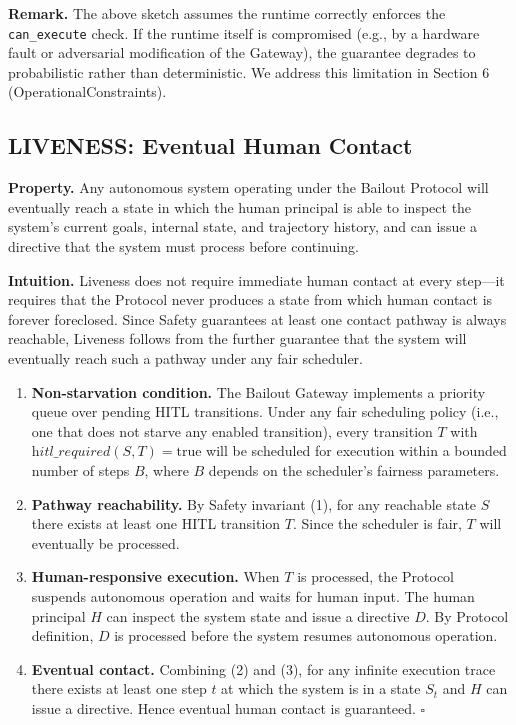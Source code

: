 \textbf{Remark.} The above sketch assumes the runtime correctly enforces the \texttt{can\_execute} check. If the runtime itself is compromised (e.g., by a hardware fault or adversarial modification of the Gateway), the guarantee degrades to probabilistic rather than deterministic. We address this limitation in Section 6 (OperationalConstraints).

\subsection{LIVENESS: Eventual Human Contact}

\textbf{Property.} Any autonomous system operating under the Bailout Protocol will eventually reach a state in which the human principal is able to inspect the system's current goals, internal state, and trajectory history, and can issue a directive that the system must process before continuing.

\textbf{Intuition.} Liveness does not require immediate human contact at every step---it requires that the Protocol never produces a state from which human contact is forever foreclosed. Since Safety guarantees at least one contact pathway is always reachable, Liveness follows from the further guarantee that the system will eventually reach such a pathway under any fair scheduler.

\begin{Proof}[Sketch]
\begin{enumerate}
    \item \textbf{Non-starvation condition.} The Bailout Gateway implements a priority queue over pending HITL transitions. Under any fair scheduling policy (i.e., one that does not starve any enabled transition), every transition $T$ with $\textit{hitl\_required}(S, T) = \text{true}$ will be scheduled for execution within a bounded number of steps $B$, where $B$ depends on the scheduler's fairness parameters.
    \item \textbf{Pathway reachability.} By Safety invariant (1), for any reachable state $S$ there exists at least one HITL transition $T$. Since the scheduler is fair, $T$ will eventually be processed.
    \item \textbf{Human-responsive execution.} When $T$ is processed, the Protocol suspends autonomous operation and waits for human input. The human principal $H$ can inspect the system state and issue a directive $D$. By Protocol definition, $D$ is processed before the system resumes autonomous operation.
    \item \textbf{Eventual contact.} Combining (2) and (3), for any infinite execution trace there exists at least one step $t$ at which the system is in a state $S_t$ and $H$ can issue a directive. Hence eventual human contact is guaranteed. $\square$
\end{enumerate}
\end{Proof}

